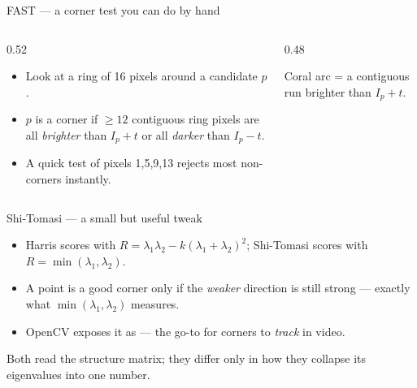 \documentclass[10pt,aspectratio=169]{beamer}
\begin{document}
\begin{frame}{FAST — a corner test you can do by hand}
  \begin{columns}[T]
    \begin{column}{0.52\textwidth}
      \begin{itemize}
        \item Look at a ring of 16 pixels around a candidate $p$.
        \item $p$ is a corner if $\geq 12$ contiguous ring pixels are all \emph{brighter} than
              $I_p+t$ or all \emph{darker} than $I_p-t$.
        \item A quick test of pixels 1,5,9,13 rejects most non-corners instantly.
      \end{itemize}
    \end{column}
    \begin{column}{0.48\textwidth}
      \begin{center}
      \end{center}
      {\scriptsize Coral arc = a contiguous run brighter than $I_p+t$.}
    \end{column}
  \end{columns}
\end{frame}

\begin{frame}{Shi-Tomasi — a small but useful tweak}
  \begin{itemize}
    \item Harris scores with $R=\lambda_1\lambda_2-k(\lambda_1+\lambda_2)^2$; Shi-Tomasi scores with
          $R=\min(\lambda_1,\lambda_2)$.
    \item A point is a good corner only if the \emph{weaker} direction is still strong — exactly what
          $\min(\lambda_1,\lambda_2)$ measures.
    \item OpenCV exposes it as  — the go-to for corners to \emph{track} in video.
  \end{itemize}
  \begin{infobox}
    Both read the structure matrix; they differ only in how they collapse its eigenvalues into one number.
  \end{infobox}
\end{frame}
\end{document}
